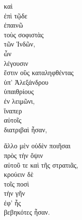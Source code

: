 
{\large
\begin{greek}
\noindent  καὶ \\
\tabto{2em} ἐπὶ τῷδε \\
ἐπαινῶ \\

τοὺς σοφιστὰς \\
\tabto{2em} τῶν Ἰνδῶν, \\
\tabto{4em} ὧν \\
\tabto{4em} λέγουσιν \\
\tabto{6em} ἔστιν οὓς καταληφθέντας \\
\tabto{8em} ὑπ' Ἀλεξάνδρου \\
\tabto{6em} ὑπαιθρίους \\
\tabto{8em} ἐν λειμῶνι, \\
\tabto{6em} ἵναπερ \\
\tabto{8em} αὐτοῖς \\
\tabto{6em} διατριβαὶ ἦσαν,

\tabto{6em} ἄλλο μὲν οὐδὲν ποιῆσαι \\
\tabto{8em} πρὸς τὴν ὄψιν \\
\tabto{10em} αὐτοῦ τε καὶ τῆς στρατιᾶς, \\
\tabto{6em} κρούειν δὲ \\
\tabto{8em} τοῖς ποσὶ \\
\tabto{6em} τὴν γῆν \\
\tabto{8em} ἐφ' ἧς \\
\tabto{10em} βεβηκότες ἦσαν.\\

\end{greek}
}

